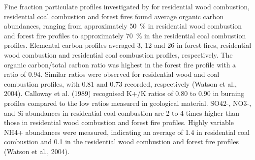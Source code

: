 \documentclass{nwureport}
\begin{document}
Fine fraction particulate profiles investigated by \cite{Watson1996} for residential wood combustion, residential coal combustion and forest fires found average organic carbon abundances, ranging from approximately \SI{50}{\percent} in residential wood combustion and forest fire profiles to approximately \SI{70}{\percent} in the residential coal combustion profiles. Elemental carbon profiles averaged \SI{3}{\perent}, \SI{12}{\perent} and \SI{26}{\perent} in forest fires, residential wood combustion and residential coal combustion profiles, respectively. The organic carbon/total carbon ratio was highest in the forest fire profile with a ratio of \num{0.94}. Similar ratios were observed for residential wood and coal combustion profiles, with \num{0.81} and \num{0.73} recorded, respectively (Watson et al., 2004). Calloway et al. (1989) recognised K+/K ratios of \num{0.80} to \num{0.90} in burning profiles compared to the low ratios measured in geological material. SO42-, NO3-, and Si abundances in residential coal combustion are \num{2} to \num{4} times higher than those in residential wood combustion and forest fire profiles. Highly variable NH4+ abundances were measured, indicating an average of \SI{1.4}{\perent} in residential coal combustion and \SI{0.1}{\perent} in the residential wood combustion and forest fire profiles (Watson et al., 2004).
\end{document}
